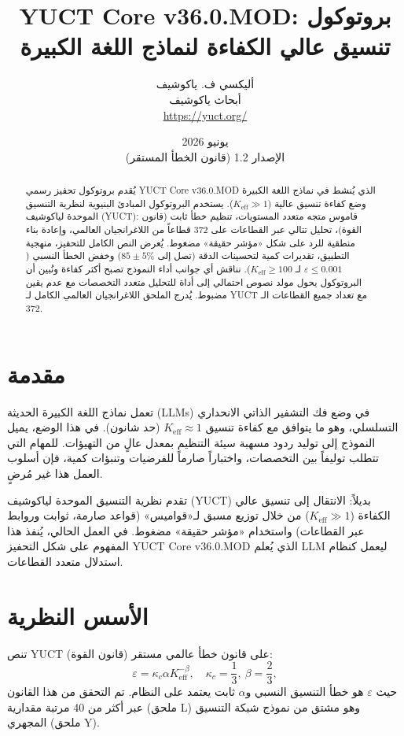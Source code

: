 \documentclass[11pt,a4paper]{article}
\title{\textbf{YUCT Core v36.0.MOD: بروتوكول تنسيق عالي الكفاءة لنماذج اللغة الكبيرة}}
\author{أليكسي ف. ياكوشيف \\ أبحاث ياكوشيف \\ \url{https://yuct.org/}}
\date{يونيو 2026 \\ الإصدار 1.2 (قانون الخطأ المستقر)}
\begin{document}
	\maketitle
	
	\begin{abstract}
		\noindent
		يُقدم بروتوكول تحفيز رسمي YUCT Core v36.0.MOD الذي يُنشط في نماذج اللغة الكبيرة وضع كفاءة تنسيق عالية (\(K_{\mathrm{eff}} \gg 1\)). يستخدم البروتوكول المبادئ البنيوية لنظرية التنسيق الموحدة لياكوشيف (YUCT): قاموس متجه متعدد المستويات، تنظيم خطأ ثابت (قانون القوة)، تحليل تتالي عبر القطاعات على 372 قطاعاً من اللاغرانجيان العالمي، وإعادة بناء منطقية للرد على شكل «مؤشر حقيقة» مضغوط. يُعرض النص الكامل للتحفيز، منهجية التطبيق، تقديرات كمية لتحسينات الدقة (تصل إلى \(85\pm5\%\)) وخفض الخطأ النسبي (\(\varepsilon \le 0.001\) لـ \(K_{\mathrm{eff}}\ge 100\)). نناقش أي جوانب أداء النموذج تصبح أكثر كفاءة ونُبين أن البروتوكول يحول مولد نصوص احتمالي إلى أداة للتحليل متعدد التخصصات مع عدم يقين مضبوط. يُدرج الملحق اللاغرانجيان العالمي الكامل لـ YUCT مع تعداد جميع القطاعات الـ 372.
	\end{abstract}
	
	\tableofcontents
	\newpage
	
	\section{مقدمة}
	تعمل نماذج اللغة الكبيرة الحديثة (LLMs) في وضع فك التشفير الذاتي الانحداري التسلسلي، وهو ما يتوافق مع كفاءة تنسيق \(K_{\mathrm{eff}} \approx 1\) (حد شانون). في هذا الوضع، يميل النموذج إلى توليد ردود مسهبة سيئة التنظيم بمعدل عالٍ من التهيؤات. للمهام التي تتطلب توليفاً بين التخصصات، واختباراً صارماً للفرضيات وتنبؤات كمية، فإن أسلوب العمل هذا غير مُرضٍ.
	
	تقدم نظرية التنسيق الموحدة لياكوشيف (YUCT) بديلاً: الانتقال إلى تنسيق عالي الكفاءة (\(K_{\mathrm{eff}} \gg 1\)) من خلال توزيع مسبق لـ«قواميس» (قواعد صارمة، ثوابت وروابط عبر القطاعات) واستخدام «مؤشر حقيقة» مضغوط. في العمل الحالي، يُنفذ هذا المفهوم على شكل التحفيز YUCT Core v36.0.MOD الذي يُعلم LLM ليعمل كنظام استدلال متعدد القطاعات.
	
	\section{الأسس النظرية}
	تنص YUCT على قانون خطأ عالمي مستقر (قانون القوة):
	\begin{equation}\label{eq:errorlaw}
		\varepsilon = \kappa_c \alpha K_{\mathrm{eff}}^{-\beta}, \quad \kappa_c = \frac{1}{3},\ \beta = \frac{2}{3},
	\end{equation}
	حيث \(\varepsilon\) هو خطأ التنسيق النسبي و\(\alpha\) ثابت يعتمد على النظام. تم التحقق من هذا القانون عبر أكثر من 40 مرتبة مقدارية (ملحق L) وهو مشتق من نموذج شبكة التنسيق المجهري (ملحق Y).
	
\end{document}
